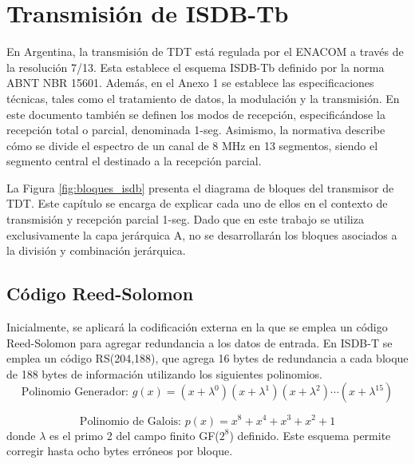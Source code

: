 \chapter{Transmisión de  ISDB-Tb}


	En Argentina, la transmisión de TDT está regulada por el ENACOM a través de la resolución 7/13. Esta establece el esquema ISDB-Tb definido por la norma ABNT NBR 15601. Además, en el Anexo 1 se establece las especificaciones técnicas, tales como el tratamiento de datos, la modulación y la transmisión. En este documento también se definen los modos de recepción, especificándose la recepción total o parcial, denominada 1-seg. Asimismo, la normativa describe cómo se divide el espectro de un canal de 8 MHz en 13 segmentos, siendo el segmento central el destinado a la recepción parcial.


	La Figura \ref{fig:bloques_isdb} presenta el diagrama de bloques del transmisor de TDT. Este capítulo se encarga de explicar cada uno de ellos en el contexto de transmisión y recepción parcial 1-seg. Dado que en este trabajo se utiliza exclusivamente la capa jerárquica A, no se desarrollarán los bloques asociados a la división y combinación jerárquica.









	\section{Código Reed-Solomon}
	Inicialmente, se aplicará la codificación externa en la que se emplea un código Reed-Solomon para agregar redundancia a los datos de entrada. En ISDB-T se emplea un código RS(204,188), que agrega 16 bytes de redundancia a cada bloque de 188 bytes de información utilizando los siguientes polinomios.
	\begin{equation}
	\text{Polinomio Generador: } g(x) = (x + \lambda^0)(x + \lambda^1)(x + \lambda^2) \cdots (x + \lambda^{15})
	\end{equation}

	\begin{equation}
		\text{Polinomio de Galois: }p(x) = x^8 + x^4 + x^3 + x^2 + 1
	\end{equation}
	donde $\lambda$ es el primo 2 del campo finito GF($2^8$) definido. Este esquema permite corregir hasta ocho bytes erróneos por bloque.


